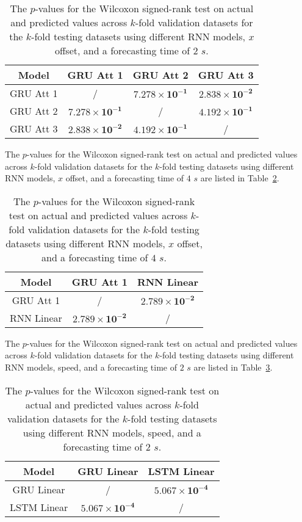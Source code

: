 \begin{table}[!ht]
	\centering
	\begin{tabular}{|c|c|c|c|}
		\hline
		Model & GRU Att 1 & GRU Att 2 & GRU Att 3 \\ \hline
		GRU Att 1 & / & $\mathbf{7.278 \times 10^{-1}}$ & $\mathbf{2.838 \times 10^{-2}}$ \\ \hline
		GRU Att 2 & $\mathbf{7.278 \times 10^{-1}}$ & / & $\mathbf{4.192 \times 10^{-1}}$ \\ \hline
		GRU Att 3 & $\mathbf{2.838 \times 10^{-2}}$ & $\mathbf{4.192 \times 10^{-1}}$ & / \\ \hline
	\end{tabular}
	\caption{The $p$-values for the Wilcoxon signed-rank test on actual and predicted values across $k$-fold validation datasets for the $k$-fold testing datasets using different RNN models, $x$ offset, and a forecasting time of $2$ $s$.}
	\label{tab:longitude:no:abs:p:2}
\end{table}

The $p$-values for the Wilcoxon signed-rank test on actual and predicted values across $k$-fold validation datasets for the $k$-fold testing datasets using different RNN models, $x$ offset, and a forecasting time of $4$ $s$ are listed in Table~\ref{tab:longitude:no:abs:p:4}.

\begin{table}[!ht]
	\centering
	\begin{tabular}{|c|c|c|}
		\hline
		Model & GRU Att 1 & RNN Linear \\ \hline
		GRU Att 1 & / & $\mathbf{2.789 \times 10^{-2}}$ \\ \hline
		RNN Linear & $\mathbf{2.789 \times 10^{-2}}$ & / \\ \hline
	\end{tabular}
	\caption{The $p$-values for the Wilcoxon signed-rank test on actual and predicted values across $k$-fold validation datasets for the $k$-fold testing datasets using different RNN models, $x$ offset, and a forecasting time of $4$ $s$.}
	\label{tab:longitude:no:abs:p:4}
\end{table}

The $p$-values for the Wilcoxon signed-rank test on actual and predicted values across $k$-fold validation datasets for the $k$-fold testing datasets using different RNN models, speed, and a forecasting time of $2$ $s$ are listed in Table~\ref{tab:speed:p:2}.

\begin{table}[!ht]
	\centering
	\begin{tabular}{|c|c|c|}
		\hline
		Model & GRU Linear & LSTM Linear \\ \hline
		GRU Linear & / & $\mathbf{5.067 \times 10^{-4}}$ \\ \hline
		LSTM Linear & $\mathbf{5.067 \times 10^{-4}}$ & / \\ \hline
	\end{tabular}
	\caption{The $p$-values for the Wilcoxon signed-rank test on actual and predicted values across $k$-fold validation datasets for the $k$-fold testing datasets using different RNN models, speed, and a forecasting time of $2$ $s$.}
	\label{tab:speed:p:2}
\end{table}

